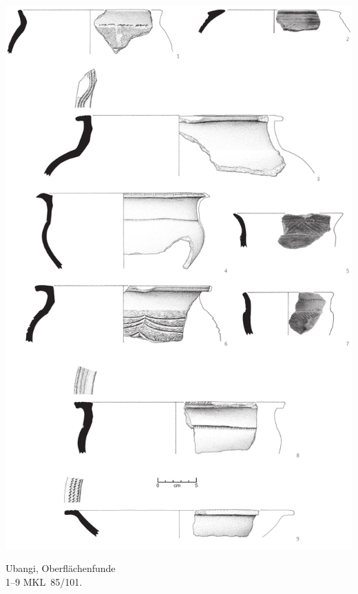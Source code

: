 \begin{pl}[H]
	\includegraphics{plt/Taf19.pdf}
	\vspace{.75em}\caption{\mbox{Ubangi}, Oberflächenfunde \\ 1--9 MKL~85/101.}
	\label{pl:19}
\end{pl}

